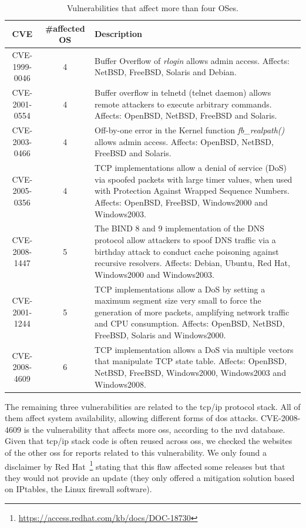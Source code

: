 \begin{table}[!ht]
\begin{center}
{\scriptsize
\begin{tabular}{|c||c| p{} | }\hline
\textbf{CVE} & \#affected OS  & Description  \\\hline\hline
CVE-1999-0046  &  4  & Buffer Overflow of \emph{rlogin} allows admin access. Affects: NetBSD, FreeBSD, Solaris and Debian. \\ \hline
CVE-2001-0554  &  4  & Buffer overflow in telnetd (telnet daemon) allows remote attackers to execute arbitrary commands. Affects: OpenBSD, NetBSD, FreeBSD and Solaris.  \\ \hline
CVE-2003-0466  &  4  & Off-by-one error in the Kernel function \emph{fb\_realpath()} allows admin access. Affects: OpenBSD, NetBSD, FreeBSD and Solaris.  \\ \hline
CVE-2005-0356  &  4  & TCP implementations allow a denial of service (DoS) via spoofed packets with large timer values, when used with Protection Against Wrapped Sequence Numbers. Affects: OpenBSD, FreeBSD, Windows2000 and Windows2003. \\ \hline
CVE-2008-1447  &  5  & The BIND 8 and 9 implementation of the DNS protocol allow attackers to spoof DNS traffic via a birthday attack to conduct cache poisoning against recursive resolvers. Affects: Debian, Ubuntu, Red Hat, Windows2000 and Windows2003.  \\ \hline
CVE-2001-1244  &  5  & TCP implementations allow a DoS by setting a maximum segment size very small to force the generation of more packets, amplifying network traffic and CPU consumption. Affects: OpenBSD, NetBSD, FreeBSD, Solaris and Windows2000. \\ \hline
CVE-2008-4609  &  6  & TCP implementation allows a DoS via multiple vectors that manipulate TCP state table. Affects: OpenBSD, NetBSD, FreeBSD, Windows2000, Windows2003 and Windows2008.   \\ \hline
\end{tabular}
}
\caption{Vulnerabilities that affect more than four OSes.}
\label{tab:spreaded_vulns}
\end{center}
\end{table}


The remaining three vulnerabilities are related to the \gls{tcp}/\gls{ip} protocol stack. 
All of them affect system availability, allowing different forms of \gls{dos} attacks. 
CVE-2008-4609 is the vulnerability that affects more \glspl{os}, according to the \gls{nvd} database. 
Given that \gls{tcp}/\gls{ip} stack code is often reused across \glspl{os}, we checked the websites of the other \glspl{os} for reports related to this vulnerability. 
We only found a disclaimer by Red Hat~\footnote{\url{https://access.redhat.com/kb/docs/DOC-18730}} stating that this flaw affected some releases but that they would not provide an update (they only offered a mitigation solution based on IPtables, the Linux firewall software).

